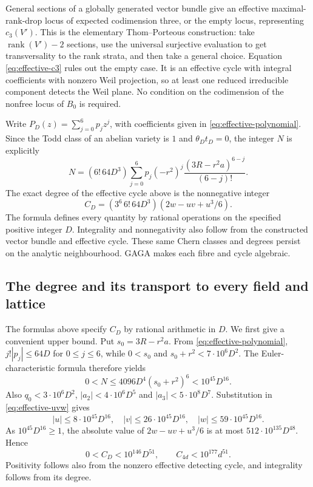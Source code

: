 General sections of a globally generated vector bundle give
an effective maximal-rank-drop locus of expected codimension
three, or the empty locus, representing $c_3(V')$. This is the
elementary Thom--Porteous construction: take
$\operatorname{rank}(V')-2$ sections, use the universal surjective
evaluation to get transversality to the rank strata, and then
take a general choice. Equation \eqref{eq:effective-c3} rules out the empty case.
It is an effective cycle with integral coefficients with nonzero Weil projection,
so at least one reduced irreducible component detects the Weil
plane. No condition on the codimension of the nonfree locus of
$B_0$ is required.

Write $P_D(z)=\sum_{j=0}^6p_jz^j$, with coefficients given in
\eqref{eq:effective-polynomial}. Since the Todd class of an abelian variety is $1$ and
$\theta_Dt_D=0$, the integer $N$ is explicitly
\[
 N=(6!\,64D^3)\sum_{j=0}^6
       p_j(-r^2)^j\frac{(3R-r^2a)^{6-j}}{(6-j)!}.
\]
The exact degree of the effective cycle above is the nonnegative
integer
\begin{equation}\label{eq:effective-degree}
 C_D=(3^6\,6!\,64D^3)(2w-uv+u^3/6).                     
\end{equation}
The formula defines every quantity by rational operations on
the specified positive integer $D$. Integrality and nonnegativity
also follow from the constructed vector bundle and effective
cycle. These same Chern classes and degrees persist on the
analytic neighbourhood. GAGA makes each fibre and cycle algebraic.

\subsection{The degree and its transport to every field and lattice}
The formulas above specify $C_D$ by rational arithmetic in $D$. We first give a convenient upper bound. Put $s_0=3R-r^2a$. From \eqref{eq:effective-polynomial}, $j!|p_j|\le64D$ for $0\le j\le6$, while $0<s_0$ and $s_0+r^2<7\cdot10^6D^2$. The Euler-characteristic formula therefore yields
\[
 0<N\le4096D^4(s_0+r^2)^6<10^{45}D^{16}.
\]
Also $q_0<3\cdot10^6D^2$, $|a_2|<4\cdot10^6D^5$ and $|a_3|<5\cdot10^8D^7$. Substitution in \eqref{eq:effective-uvw} gives
\[
 |u|\le8\cdot10^{45}D^{16},\quad
 |v|\le26\cdot10^{45}D^{16},\quad
 |w|\le59\cdot10^{45}D^{16}.
\]
As $10^{45}D^{16}\ge1$, the absolute value of $2w-uv+u^3/6$ is at most $512\cdot10^{135}D^{48}$. Hence
\[
 0<C_D<10^{146}D^{51},\qquad C_{4d}<10^{177}d^{51}.
\]
Positivity follows also from the nonzero effective detecting cycle, and integrality follows from its degree.

